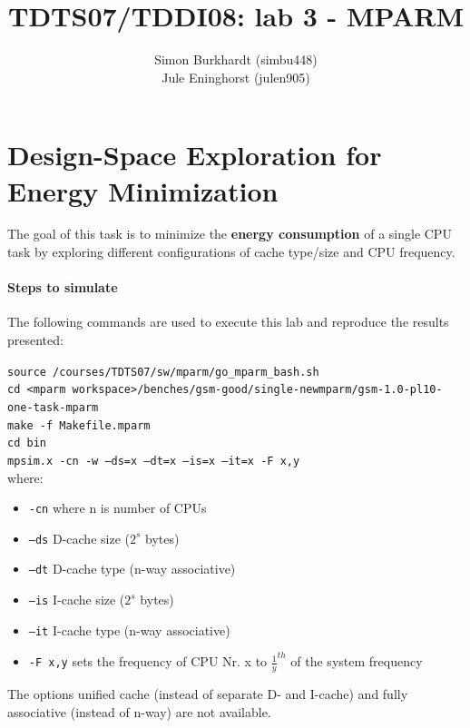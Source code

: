 \documentclass[10pt,bibliography=totocnumbered,listof=totocnumbered, footsepline, headsepline]{scrreprt}
\begin{document}
\title{TDTS07/TDDI08: lab 3 - MPARM}
\author{Simon Burkhardt (simbu448)\\ Jule Eninghorst (julen905)}
\maketitle

\section{Design-Space Exploration for Energy Minimization}

The goal of this task is to minimize the \textbf{energy consumption} of a single CPU task by exploring different configurations of cache type/size and CPU frequency.

\paragraph*{Steps to simulate} 
The following commands are used to execute this lab and reproduce the results presented:

\texttt{source /courses/TDTS07/sw/mparm/go\_mparm\_bash.sh} \\
\texttt{cd <mparm workspace>/benches/gsm-good/single-newmparm/gsm-1.0-pl10-one-task-mparm} \\
\texttt{make -f Makefile.mparm} \\
\texttt{cd bin} \\
\texttt{mpsim.x -cn -w --ds=x --dt=x --is=x --it=x -F x,y} \\

where:

\begin{itemize}
    \item \texttt{-cn} where n is number of CPUs
    \item \texttt{--ds} D-cache size ($2^s$ bytes)
    \item \texttt{--dt} D-cache type (n-way associative)
    \item \texttt{--is} I-cache size ($2^s$ bytes)
    \item \texttt{--it} I-cache type (n-way associative)
    \item \texttt{-F x,y} sets the frequency of CPU Nr. x to $\frac{1}{y}^{th}$ of the system frequency
\end{itemize}

The options unified cache (instead of separate D- and I-cache) and fully associative (instead of n-way) are not available.
\end{document}
